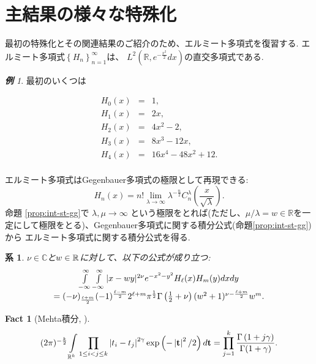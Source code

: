 \documentclass[12pt]{article} %
\newtheorem{cor}{系}
\newtheorem*{fact*}{Fact}
\theoremstyle{remark}
\newtheorem*{example*}{\textbf{例}}
\begin{document}
\section{主結果の様々な特殊化}
最初の特殊化とその関連結果のご紹介のため、エルミート多項式を復習する.
エルミート多項式$\left\{ H_n \right\}_{n=1}^\infty$は、
	$L^2\left( \mathbb{R},e^{-\frac{x^2}{2}}dx \right)$の直交多項式である.
	\begin{example*}
		最初のいくつは
	
		\begin{eqnarray*}
		H_0(x)&=& 1,\\
		H_1(x)&=& 2x,\\
		H_2(x)&=& 
		4x^2-2,\\
		H_3(x)&=& 8x^3-12x,\\
		H_4(x)&=& 16x^4-48x^2+12.\\
		\end{eqnarray*}
	\end{example*}
	エルミート多項式はGegenbauer多項式の極限として再現できる:
	\begin{equation*}
			H_n (x) = n! \lim_{\lambda \rightarrow \infty} \lambda^{- \frac{n}{2}}
			C_n^{\lambda} \left( \frac{x}{\sqrt{\lambda}} \right).
	\end{equation*}
	命題 \ref{prop:int-st-gg}で $\lambda,\mu\to\infty$ 
	という極限をとれば(ただし、$\mu/\lambda=w\in\mathbb{R}$を一定にして極限をとる)、Gegenbauer多項式に関する積分公式(命題\ref{prop:int-st-gg})から
	エルミート多項式に関する積分公式を得る.
	\begin{cor}\label{cor:int-xzy-hh}
		$\nu\in\mathbb{C}$と$w\in\mathbb{R}$に対して、以下の公式が成り立つ:
		\begin{equation*}
			\begin{array}[]{c}
			\int_{- \infty}^{\infty} \int_{- \infty}^{\infty} | x - w y |^{2 \nu} e^{-
			x^2 - y^2} H_\ell (x) H_m (y) d x d y \\= (- \nu)_{\frac{\ell + m}{2}} (- 1)^{\frac{\ell
			- m}{2}} 2^{\ell + m} \pi^{\frac{1}{2}} \Gamma \left( \frac{1}{2} + \nu \right)
			(w^2 + 1)^{\nu - \frac{\ell + m}{2}} w^m .
			\end{array}
		\end{equation*}
	\end{cor}
	\begin{fact*}[Mehta積分, {\cite{mehta2004random}}]
			{
		\begin{equation*}
			\begin{array}[]{c}
			{(2\pi)^{-\frac{k}{2}}}\displaystyle\int_{\mathbb{R}^k}\prod_{1\le i<j\le k}\myabs{t_i-t_j}^{2\gamma}\exp\left( -\myabs{\mathbf{t}}^2/2 \right)d\mathbf{t}
			=\displaystyle\prod_{j=1}^k\frac{\Gamma\left( 
			1+j\gamma\right)}{\Gamma(1+\gamma)}.
			\end{array}
		\end{equation*}
	}
		\end{fact*}
\end{document}
